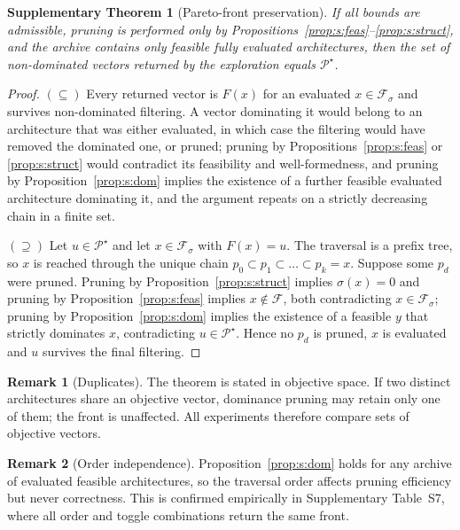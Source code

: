 \documentclass[preprint,11pt,3p]{elsarticle}
\theoremstyle{plain}
\newtheorem{theorem}{Supplementary Theorem}
\theoremstyle{definition}
\newtheorem{remark}{Remark}
\newcommand{\F}{\mathcal{F}}
\newcommand{\PS}{\mathcal{P}^{\star}}
\begin{document}
\begin{theorem}[Pareto-front preservation]
\label{thm:s:exact}
If all bounds are admissible, pruning is performed only by
Propositions~\ref{prop:s:feas}--\ref{prop:s:struct}, and the archive contains only
feasible fully evaluated architectures, then the set of non-dominated vectors returned by
the exploration equals $\PS$.
\end{theorem}
\begin{proof}
$(\subseteq)$ Every returned vector is $F(x)$ for an evaluated $x\in\F_\sigma$ and
survives non-dominated filtering. A vector dominating it would belong to an architecture
that was either evaluated, in which case the filtering would have removed the dominated
one, or pruned; pruning by Propositions~\ref{prop:s:feas} or \ref{prop:s:struct} would
contradict its feasibility and well-formedness, and pruning by
Proposition~\ref{prop:s:dom} implies the existence of a further feasible evaluated
architecture dominating it, and the argument repeats on a strictly decreasing chain in a
finite set.

$(\supseteq)$ Let $u\in\PS$ and let $x\in\F_\sigma$ with $F(x)=u$. The traversal is a
prefix tree, so $x$ is reached through the unique chain $p_0\subset p_1\subset\dots\subset
p_k=x$. Suppose some $p_d$ were pruned. Pruning by Proposition~\ref{prop:s:struct} implies
$\sigma(x)=0$ and pruning by Proposition~\ref{prop:s:feas} implies $x\notin\F$, both
contradicting $x\in\F_\sigma$; pruning by Proposition~\ref{prop:s:dom} implies the
existence of a feasible $y$ that strictly dominates $x$, contradicting $u\in\PS$. Hence no
$p_d$ is pruned, $x$ is evaluated and $u$ survives the final filtering.
\end{proof}

\begin{remark}[Duplicates]
The theorem is stated in objective space. If two distinct architectures share an objective
vector, dominance pruning may retain only one of them; the front is unaffected. All
experiments therefore compare sets of objective vectors.
\end{remark}

\begin{remark}[Order independence]
Proposition~\ref{prop:s:dom} holds for any archive of evaluated feasible architectures, so
the traversal order affects pruning efficiency but never correctness. This is confirmed
empirically in Supplementary Table~S7, where all order and toggle combinations return the
same front.
\end{remark}
\end{document}
